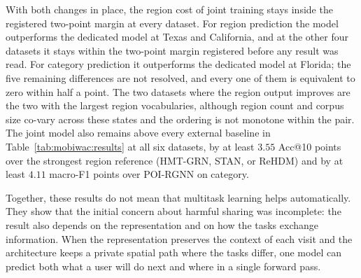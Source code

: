 With both changes in place, the region cost of joint training stays inside the registered two-point
margin at every dataset. For region
prediction the model outperforms the dedicated model at Texas and California, and at the other four
datasets it stays within the two-point margin registered before any result was read. For category
prediction it outperforms the dedicated model at Florida; the five remaining differences are not
resolved, and every one of them is equivalent to zero within half a point. The two datasets where
the region output improves are the two with the largest region vocabularies, although region
count and corpus size co-vary across these
states and the ordering is not monotone within the pair.
The joint model also remains above every
external baseline in Table~\ref{tab:mobiwac:results} at all six datasets, by at least $3.55$ Acc@10
points over the strongest region reference (HMT-GRN, STAN, or ReHDM) and by at least $4.11$ macro-F1 points over POI-RGNN on category.

Together, these results do not mean that multitask learning helps automatically. They show that the initial concern
about harmful sharing was incomplete: the result also depends on the representation and on how the tasks exchange
information. When the representation preserves the context of each visit and the architecture keeps a private spatial
path where the tasks differ, one model can predict both what a user will do next and where in a single forward pass.
